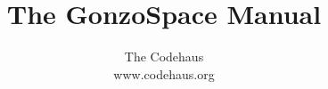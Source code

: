 \documentclass[10pt,letterpaper]{book}
\begin{document}
\let\footnoterule\hrule

\makeatletter
\renewcommand{\@makefntext}[1]%
	{\noindent\makebox[1.8em][r]{\@makefnmark}#1}
\makeatother

\title{
	The GonzoSpace Manual
}

\author{
	\textsf{The Codehaus}\\
	\textsf{www.codehaus.org}\\
}


\frontmatter

\maketitle

\tableofcontents

\listoffigures 

%

\mainmatter


%



\appendix




\backmatter


\small
\printindex
\end{document}

